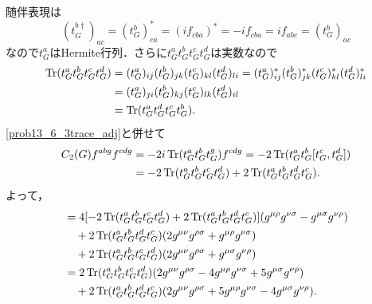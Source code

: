 随伴表現は
\[ (t_G^{b\dagger})_{ac} = (t_G^b)_{ca}^\ast = (if_{cba})^\ast = -i f_{cba} = if_{abc} = (t_G^b)_{ac} \]
なので$t_G^a$はHermite行列．さらに$t_G^a t_G^b t_G^c t_G^d$は実数なので
\begin{align}
  \begin{split}
    \operatorname{Tr}(t_G^a t_G^b t_G^c t_G^d)
    &= (t_G^a)_{ij} (t_G^b)_{jk} (t_G^c)_{kl} (t_G^d)_{li}
    = (t_G^a)_{ij}^\ast (t_G^b)_{jk}^\ast (t_G^c)_{kl}^\ast (t_G^d)_{li}^\ast \\
    &= (t_G^a)_{ji} (t_G^b)_{kj} (t_G^c)_{lk} (t_G^d)_{il} \\
    &= \operatorname{Tr}(t_G^a t_G^d t_G^c t_G^b) .
  \end{split}
  \label{prob13_6_4trace_adj}
\end{align}
\eqref{prob13_6_3trace_adj}と併せて
\begin{align}
  \begin{split}
    C_2(G) f^{abg} f^{cdg}
    &= -2i \operatorname{Tr}(t_G^a t_G^b t_G^g) f^{cdg} = -2 \operatorname{Tr}(t_G^a t_G^b [t_G^c, t_G^d]) \\
    &= -2 \operatorname{Tr}(t_G^a t_G^b t_G^c t_G^d) + 2 \operatorname{Tr}(t_G^a t_G^b t_G^d t_G^c) .
  \end{split}
  \label{prob13_6_C_2_to_4trace}
\end{align}
よって，
\begin{align*}
  &= 4 [-2 \operatorname{Tr}(t_G^a t_G^b t_G^c t_G^d) + 2 \operatorname{Tr}(t_G^a t_G^b t_G^d t_G^c)] (g^{\mu\rho} g^{\nu\sigma} - g^{\mu\sigma} g^{\nu\rho}) \\
  &\quad + 2 \operatorname{Tr}(t_G^a t_G^b t_G^d t_G^c) (2 g^{\mu\nu} g^{\rho\sigma} + g^{\mu\rho} g^{\nu\sigma}) \\
  &\quad + 2 \operatorname{Tr}(t_G^a t_G^b t_G^c t_G^d) (2 g^{\mu\nu} g^{\rho\sigma} + g^{\mu\sigma} g^{\nu\rho}) \\
  &= 2 \operatorname{Tr}(t_G^a t_G^b t_G^c t_G^d) (2g^{\mu\nu} g^{\rho\sigma} - 4g^{\mu\rho} g^{\nu\sigma} + 5g^{\mu\sigma} g^{\nu\rho}) \\
  &\quad + 2 \operatorname{Tr}(t_G^a t_G^b t_G^d t_G^c) (2g^{\mu\nu} g^{\rho\sigma} + 5g^{\mu\rho} g^{\nu\sigma} - 4g^{\mu\sigma} g^{\nu\rho}) .
\end{align*}

